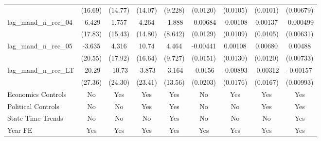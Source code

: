 {\begin{longtable}{l*{8}{c}}
                    &     (16.69)         &     (14.77)         &     (14.07)         &     (9.228)         &    (0.0120)         &    (0.0105)         &    (0.0101)         &   (0.00679)         \\
[1em]
lag\_mand\_n\_rec\_04   &      -6.429         &       1.757         &       4.264         &      -1.888         &    -0.00684         &    -0.00108         &     0.00137         &   -0.000499         \\
                    &     (17.83)         &     (15.43)         &     (14.80)         &     (8.642)         &    (0.0129)         &    (0.0109)         &    (0.0105)         &   (0.00631)         \\
[1em]
lag\_mand\_n\_rec\_05   &      -3.635         &       4.316         &       10.74         &       4.464         &    -0.00441         &     0.00108         &     0.00680         &     0.00488         \\
                    &     (20.55)         &     (17.92)         &     (16.64)         &     (9.727)         &    (0.0151)         &    (0.0130)         &    (0.0120)         &   (0.00733)         \\
[1em]
lag\_mand\_n\_rec\_LT   &      -20.29         &      -10.73         &      -3.873         &      -3.164         &     -0.0156         &    -0.00893         &    -0.00312         &    -0.00157         \\
                    &     (27.36)         &     (24.30)         &     (23.41)         &     (13.56)         &    (0.0203)         &    (0.0176)         &    (0.0167)         &   (0.00993)         \\
[1em]
Economics Controls  &          No         &         Yes         &         Yes         &         Yes         &          No         &         Yes         &         Yes         &         Yes         \\
[1em]
Political Controls  &          No         &          No         &         Yes         &         Yes         &          No         &          No         &         Yes         &         Yes         \\
[1em]
State Time Trends   &          No         &          No         &          No         &         Yes         &          No         &          No         &          No         &         Yes         \\
[1em]
Year FE             &         Yes         &         Yes         &         Yes         &         Yes         &         Yes         &         Yes         &         Yes         &         Yes         \\

\end{longtable}}

